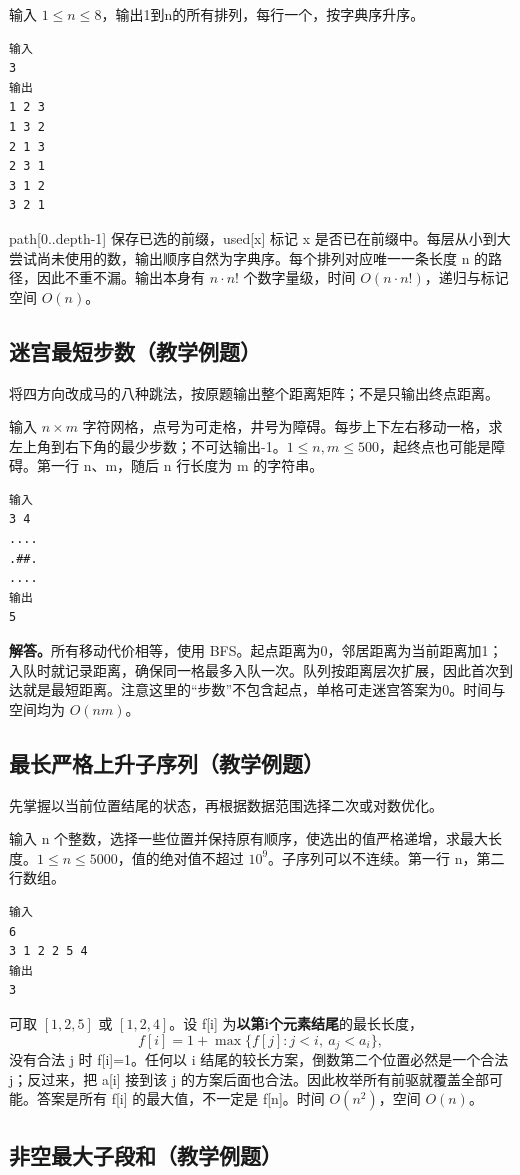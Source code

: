 输入 $1\le n\le8$，输出1到n的所有排列，每行一个，按字典序升序。
\begin{verbatim}
输入
3
输出
1 2 3
1 3 2
2 1 3
2 3 1
3 1 2
3 2 1
\end{verbatim}
path[0..depth-1] 保存已选的前缀，used[x] 标记 x 是否已在前缀中。每层从小到大尝试尚未使用的数，输出顺序自然为字典序。每个排列对应唯一一条长度 n 的路径，因此不重不漏。输出本身有 $n\cdot n!$ 个数字量级，时间 $O(n\cdot n!)$，递归与标记空间 $O(n)$。
\subsection{迷宫最短步数（教学例题）}

将四方向改成马的八种跳法，按原题输出整个距离矩阵；不是只输出终点距离。

输入 $n\times m$ 字符网格，点号为可走格，井号为障碍。每步上下左右移动一格，求左上角到右下角的最少步数；不可达输出-1。$1\le n,m\le500$，起终点也可能是障碍。第一行 n、m，随后 n 行长度为 m 的字符串。
\begin{verbatim}
输入
3 4
....
.##.
....
输出
5
\end{verbatim}

\noindent\textbf{解答。}所有移动代价相等，使用 BFS。起点距离为0，邻居距离为当前距离加1；入队时就记录距离，确保同一格最多入队一次。队列按距离层次扩展，因此首次到达就是最短距离。注意这里的“步数”不包含起点，单格可走迷宫答案为0。时间与空间均为 $O(nm)$。
\subsection{最长严格上升子序列（教学例题）}

先掌握以当前位置结尾的状态，再根据数据范围选择二次或对数优化。

输入 n 个整数，选择一些位置并保持原有顺序，使选出的值严格递增，求最大长度。$1\le n\le5000$，值的绝对值不超过 $10^9$。子序列可以不连续。第一行 n，第二行数组。
\begin{verbatim}
输入
6
3 1 2 2 5 4
输出
3
\end{verbatim}
可取 $[1,2,5]$ 或 $[1,2,4]$。设 f[i] 为\textbf{以第i个元素结尾}的最长长度，
\[f[i]=1+\max\{f[j]:j<i,\ a_j<a_i\},\]
没有合法 j 时 f[i]=1。任何以 i 结尾的较长方案，倒数第二个位置必然是一个合法 j；反过来，把 a[i] 接到该 j 的方案后面也合法。因此枚举所有前驱就覆盖全部可能。答案是所有 f[i] 的最大值，不一定是 f[n]。时间 $O(n^2)$，空间 $O(n)$。
\subsection{非空最大子段和（教学例题）}

